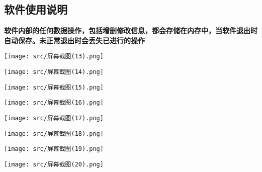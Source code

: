\documentclass{article}
\begin{document}
\subsection{软件使用说明}
\textbf{软件内部的任何数据操作，包括增删修改信息，都会存储在内存中，当软件退出时自动保存。未正常退出时会丢失已进行的操作}\\

\begin{center}
    \texttt{[image: src/屏幕截图(13).png]}
\end{center}


\begin{center}
    \texttt{[image: src/屏幕截图(14).png]}
\end{center}


\begin{center}
    \texttt{[image: src/屏幕截图(15).png]}
\end{center}

\begin{center}
    \texttt{[image: src/屏幕截图(16).png]}
\end{center}

\begin{center}
    \texttt{[image: src/屏幕截图(17).png]}
\end{center}

\begin{center}
    \texttt{[image: src/屏幕截图(18).png]}
\end{center}

\begin{center}
    \texttt{[image: src/屏幕截图(19).png]}
\end{center}
\begin{center}
    \texttt{[image: src/屏幕截图(20).png]}
\end{center}
\end{document}
